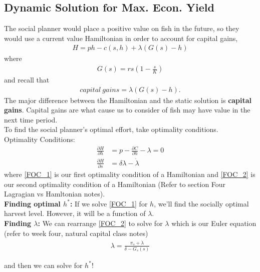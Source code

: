 \documentclass{article}
\begin{document}
\subsection{Dynamic Solution for Max. Econ. Yield}
The social planner would place a positive value on fish in the future, so they would use a current value Hamiltonian in order to account for capital gains,
\begin{align}
    H = ph - c(s,h) + \lambda (G(s) - h)
\end{align}
where 
\begin{align}
    G(s) = rs(1 - \frac{s}{K})
\end{align}
and recall that 
\begin{align}
    capital\ gains = \lambda (G(s) - h).
\end{align}
The major difference between the Hamiltonian and the static solution is \textbf{capital gains}. Capital gains are what cause us to consider of fish may have value in the next time period. \\

To find the social planner's optimal effort, take optimality conditions. \\

Optimality Conditions: 
\begin{align}
    \frac{\partial H}{\partial h} &= p - \frac{\partial C}{\partial h} - \lambda = 0 \label{FOC_1} \\
    \frac{\partial H}{\partial s} &= \delta \lambda - \dot \lambda \label{FOC_2}
\end{align}
where \ref{FOC_1} is our first optimality condition of a Hamiltonian and \ref{FOC_2} is our second optimality condition of a Hamiltonian (Refer to section Four Lagragian vs Hamltonian notes). \\

\textbf{Finding optimal $h^*$:} If we solve \ref{FOC_1} for $h$, we'll find the socially optimal harvest level. However, it will  be a function of $\lambda$. \\

\textbf{Finding $\lambda$:} We can rearrange \ref{FOC_2} to solve for $\lambda$ which is our Euler equation (refer to week four, natural capital class notes) 
\begin{align}
    \lambda = \frac{\pi_s + \dot \lambda}{\delta - G_s(s)}
\end{align}

and then we can solve for $h^*$!\\
\end{document}
